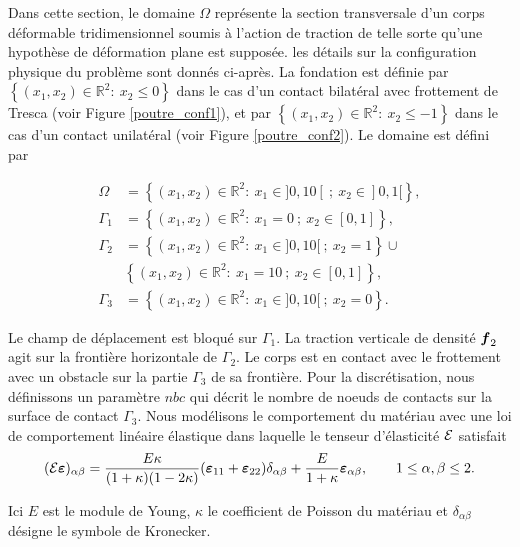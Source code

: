 Dans cette section, le domaine $\Omega $ représente la section transversale d'un corps déformable tridimensionnel soumis à l'action de traction de telle sorte qu'une hypothèse de déformation plane est supposée. les détails sur la configuration physique du problème sont donnés ci-après. La fondation est définie par\\ $\left\{(x_1,x_2) \in \mathbb{R}^2:  \ x_2 \leq 0 \right\}$ dans le cas d'un contact bilatéral avec frottement de Tresca (voir Figure \ref{poutre_conf1}), et par $\left\{(x_1,x_2)\in \mathbb{R}^2:  \ x_2 \leq -1 \right\}$ dans le cas d'un contact unilatéral (voir Figure \ref{poutre_conf2}). Le domaine est défini par

\begin{align*}
\Omega&=\left\{(x_1,x_2)\in \mathbb{R}^2:  \ x_1 \in ]0,10[
\ ;  \ x_2 \in ]0,1[ \right\},\\
\Gamma_1&=  \left\{(x_1,x_2)\in \mathbb{R}^2: \ x_1=0 \ ; \ x_2 \in [0,1] \right\},\\
\Gamma_2&=  \left\{(x_1,x_2)\in \mathbb{R}^2: \ x_1 \in ]0,10[ \ ; \ x_2 = 1 \right\} \cup  \\ 
& \left\{(x_1,x_2)\in \mathbb{R}^2: \ x_1=10 \ ; \ x_2 \in [0,1] \right\},\\
\Gamma_3&=\left\{(x_1,x_2)\in \mathbb{R}^2: \ x_1 \in ]0,10[ \ ; \  x_2 = 0 \right\}.
\end{align*}

Le champ de déplacement est bloqué sur $\Gamma_1$. La traction verticale de densité $\mbox{\boldmath{$f$}}_2$ agit sur la frontière horizontale de $\Gamma_2$. Le corps est en contact avec le frottement avec un obstacle sur la partie $\Gamma_3$ de sa frontière. Pour la discrétisation, nous définissons un paramètre $nbc$ qui décrit le nombre de noeuds de contacts sur la surface de contact $\Gamma_3$. Nous modélisons le comportement du matériau avec une loi de comportement linéaire élastique dans laquelle le tenseur d'élasticité ${\cal E}$ satisfait
\begin{equation*}
({\cal E}\mbox{\boldmath{$\varepsilon$}})_{\alpha
	\beta}=\frac{E\kappa}{(1+\kappa)(1-2\kappa)}(\mbox{\boldmath{$\varepsilon$}}_{11}+\mbox{\boldmath{$\varepsilon$}}_{22})\delta_{\alpha
	\beta}+\frac{E}{1+\kappa}\mbox{\boldmath{$\varepsilon$}}_{\alpha \beta}, \qquad 1\leq
\alpha,\beta\leq 2.
\end{equation*}

Ici $E$ est le module de Young, $\kappa$ le coefficient de Poisson du matériau et $\delta_ {\alpha \beta}$ désigne le symbole de Kronecker.

